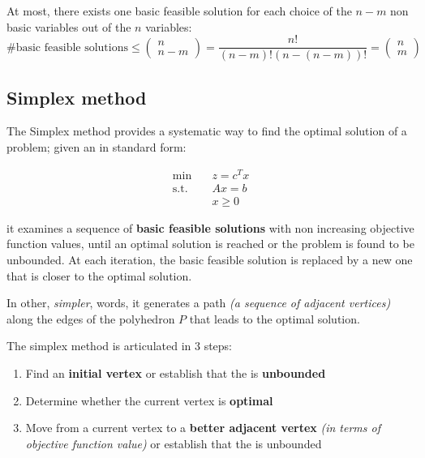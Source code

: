 \documentclass[english]{article}
\begin{document}
\begin{property}
  At most, there exists one basic feasible solution for each choice of the \(n-m\) non basic variables out of the \(n\) variables:
  \[\text{\# basic feasible solutions} \leq
    \begin{pmatrix}
      n \\ n-m
    \end{pmatrix}
    = \dfrac{n!}{\left( n - m \right)! \left( n - \left( n-m \right) \right)!} =
    \begin{pmatrix}
      n \\ m
    \end{pmatrix}
  \]
\end{property}

\subsection{Simplex method}

The Simplex method provides a systematic way to find the optimal solution of a \LP problem;
given an \LP in standard form:

\begin{align*}
  \min \quad        & z = c^T x \\
  \text{s.t.} \quad & Ax = b    \\
                    & x \geq 0
\end{align*}

it examines a sequence of \textbf{basic feasible solutions} with non increasing objective function values, until an optimal solution is reached or the problem is found to be unbounded.
At each iteration, the basic feasible solution is replaced by a new one that is closer to the optimal solution.

In other, \textit{simpler}, words, it generates a path \textit{(a sequence of adjacent vertices)} along the edges of the polyhedron \(P\) that leads to the optimal solution.

\bigskip
The simplex method is articulated in \(3\) steps:

\begin{enumerate}[label=\arabic*., ref=(\arabic*)]
  \item Find an \textbf{initial vertex} or establish that the \LP is \textbf{unbounded}
  \item Determine whether the current vertex is \textbf{optimal}
  \item \label{enum:simplex-method-3} Move from a current vertex to a \textbf{better adjacent vertex} \textit{(in terms of objective function value)} or establish that the \LP is unbounded
\end{enumerate}
\end{document}
